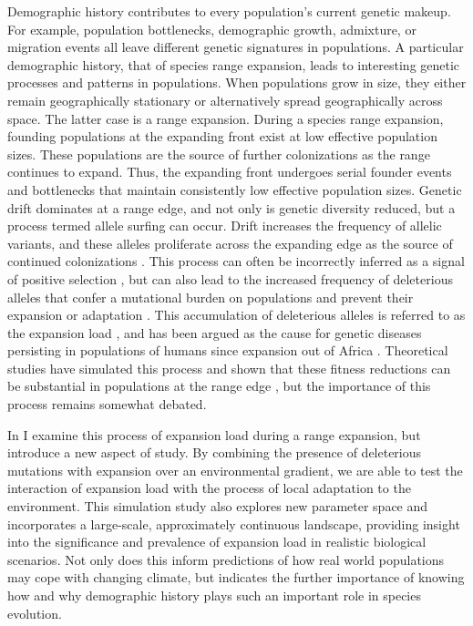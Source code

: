 Demographic history contributes to every population's current genetic makeup. For example, population bottlenecks, demographic growth, admixture, or migration events all leave different genetic signatures in populations. A particular demographic history, that of species range expansion, leads to interesting genetic processes and patterns in populations. When populations grow in size, they either remain geographically stationary or alternatively spread geographically across space. The latter case is a range expansion. During a species range expansion, founding populations at the expanding front exist at low effective population sizes. These populations are the source of further colonizations as the range continues to expand. Thus, the expanding front undergoes serial founder events and bottlenecks that maintain consistently low effective population sizes. Genetic drift dominates at a range edge, and not only is genetic diversity reduced, but a process termed allele surfing can occur. Drift increases the frequency of allelic variants, and these alleles proliferate across the expanding edge as the source of continued colonizations \citep{Klopfstein:2006}. This process can often be incorrectly inferred as a signal of positive selection \citep{Edmonds:2004}, but can also lead to the increased frequency of deleterious alleles that confer a mutational burden on populations and prevent their expansion or adaptation \citep{Peischl:2013, Peischl:2015, Excoffier:2009}. This accumulation of deleterious alleles is referred to as the expansion load \citep{Peischl:2013}, and has been argued as the cause for genetic diseases persisting in populations of humans since expansion out of Africa \citep{Henn:2015, Henn:2015b, Lohmueller:2008, Lohmueller:2014b, Do:2015}. Theoretical studies have simulated this process and shown that these fitness reductions can be substantial in populations at the range edge \citep{Peischl:2013, Peischl:2015, Peischl:2015b}, but the importance of this process remains somewhat debated.

In  I examine this process of expansion load during a range expansion, but introduce a new aspect of study. By combining the presence of deleterious mutations with expansion over an environmental gradient, we are able to test the interaction of expansion load with the process of local adaptation to the environment. This simulation study also explores new parameter space and incorporates a large-scale, approximately continuous landscape, providing insight into the significance and prevalence of expansion load in realistic biological scenarios. Not only does this inform predictions of how real world populations may cope with changing climate, but indicates the further importance of knowing how and why demographic history plays such an important role in species evolution.

